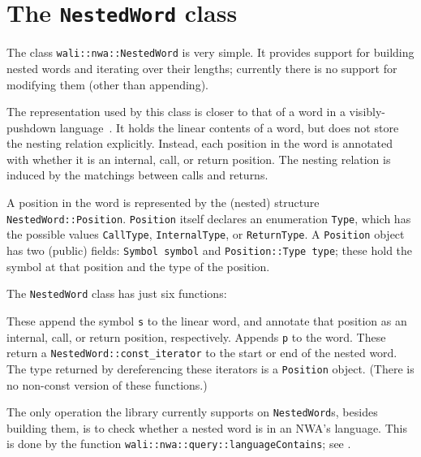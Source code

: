 \section{The \texttt{NestedWord} class}
\label{Se:class-nested-word}

The class \texttt{wali::nwa::NestedWord} is very simple. It provides support for
building nested words and iterating over their lengths; currently there
is no support for modifying them (other than appending).

The representation used by this class is closer to that of a word in a
visibly-pushdown language~\cite{JACM:AM2009}. It holds the linear contents of
a word, but does not store the nesting relation explicitly. Instead, each
position in the word is annotated with whether it is an internal, call, or
return position. The nesting relation is induced by the matchings between
calls and returns.

A position in the word is represented by the (nested) structure
\texttt{NestedWord::Position}. \texttt{Position} itself declares an
enumeration \texttt{Type}, which has the possible values \texttt{CallType},
\texttt{InternalType}, or \texttt{ReturnType}.
A \texttt{Position} object has two (public) fields: \texttt{Symbol symbol}
and \texttt{Position::Type type}; these hold the symbol at that position and
the type of the position.


The \texttt{NestedWord} class has just six functions:
\begin{functionlist}
    These append the symbol \texttt{s} to the linear word, and annotate that
    position as an internal, call, or return position, respectively.
    Appends \texttt{p} to the word.
    These return a \texttt{NestedWord::const\_iterator} to the start or end
    of the nested word. The type returned by dereferencing these iterators is
    a \texttt{Position} object. (There is no non-const version of these
    functions.)
\end{functionlist}

The only operation the library currently supports on
\texttt{NestedWord}s, besides building them, is to check whether a
nested word is in an NWA's language. This is done by the function
\texttt{wali::nwa::query::languageContains}; see
.

